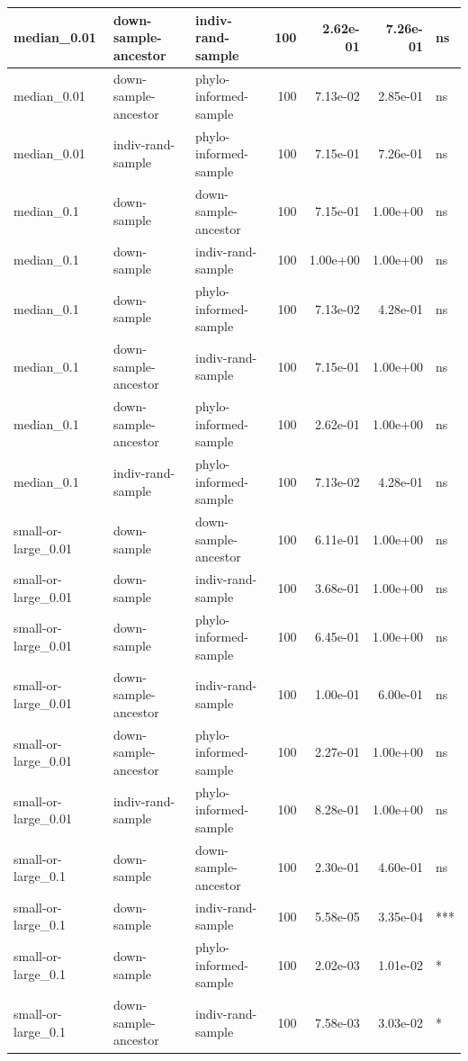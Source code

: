 \documentclass[
]{book}
\begin{document}
\begin{table}
\begin{tabular}[t]{l|l|l|r|r|r|l}
\hline
median\_0.01 & down-sample-ancestor & indiv-rand-sample & 100 & 2.62e-01 & 7.26e-01 & ns\\
\hline
median\_0.01 & down-sample-ancestor & phylo-informed-sample & 100 & 7.13e-02 & 2.85e-01 & ns\\
\hline
median\_0.01 & indiv-rand-sample & phylo-informed-sample & 100 & 7.15e-01 & 7.26e-01 & ns\\
\hline
median\_0.1 & down-sample & down-sample-ancestor & 100 & 7.15e-01 & 1.00e+00 & ns\\
\hline
median\_0.1 & down-sample & indiv-rand-sample & 100 & 1.00e+00 & 1.00e+00 & ns\\
\hline
median\_0.1 & down-sample & phylo-informed-sample & 100 & 7.13e-02 & 4.28e-01 & ns\\
\hline
median\_0.1 & down-sample-ancestor & indiv-rand-sample & 100 & 7.15e-01 & 1.00e+00 & ns\\
\hline
median\_0.1 & down-sample-ancestor & phylo-informed-sample & 100 & 2.62e-01 & 1.00e+00 & ns\\
\hline
median\_0.1 & indiv-rand-sample & phylo-informed-sample & 100 & 7.13e-02 & 4.28e-01 & ns\\
\hline
small-or-large\_0.01 & down-sample & down-sample-ancestor & 100 & 6.11e-01 & 1.00e+00 & ns\\
\hline
small-or-large\_0.01 & down-sample & indiv-rand-sample & 100 & 3.68e-01 & 1.00e+00 & ns\\
\hline
small-or-large\_0.01 & down-sample & phylo-informed-sample & 100 & 6.45e-01 & 1.00e+00 & ns\\
\hline
small-or-large\_0.01 & down-sample-ancestor & indiv-rand-sample & 100 & 1.00e-01 & 6.00e-01 & ns\\
\hline
small-or-large\_0.01 & down-sample-ancestor & phylo-informed-sample & 100 & 2.27e-01 & 1.00e+00 & ns\\
\hline
small-or-large\_0.01 & indiv-rand-sample & phylo-informed-sample & 100 & 8.28e-01 & 1.00e+00 & ns\\
\hline
small-or-large\_0.1 & down-sample & down-sample-ancestor & 100 & 2.30e-01 & 4.60e-01 & ns\\
\hline
small-or-large\_0.1 & down-sample & indiv-rand-sample & 100 & 5.58e-05 & 3.35e-04 & ***\\
\hline
small-or-large\_0.1 & down-sample & phylo-informed-sample & 100 & 2.02e-03 & 1.01e-02 & *\\
\hline
small-or-large\_0.1 & down-sample-ancestor & indiv-rand-sample & 100 & 7.58e-03 & 3.03e-02 & *\\

\end{tabular}
\end{table}
\end{document}
